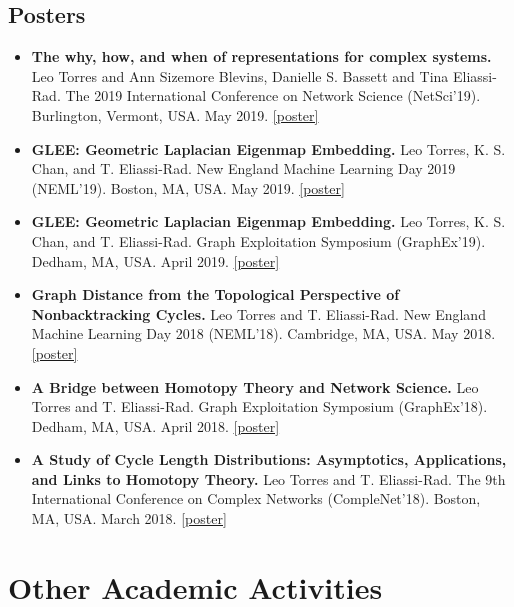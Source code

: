 \documentclass[12pt,]{scrartcl}
\begin{document}
\subsection{Posters}\label{posters}

\begin{itemize}
\leftskip-0.25in %

\item \textbf{The why, how, and when of representations for complex systems.} Leo Torres and Ann Sizemore Blevins, Danielle S. Bassett and Tina Eliassi-Rad. The 2019 International Conference on Network Science (NetSci'19). Burlington, Vermont, USA. May 2019. \href{http://leotrs.com/static/hyper_poster.pdf}{[poster]}

\item \textbf{GLEE: Geometric Laplacian Eigenmap Embedding.} Leo Torres, K. S. Chan, and T. Eliassi-Rad. New England Machine Learning Day 2019 (NEML'19). Boston, MA, USA. May 2019. \href{http://leotrs.com/static/glee_poster.pdf}{[poster]}

\item \textbf{GLEE: Geometric Laplacian Eigenmap Embedding.} Leo Torres, K. S. Chan, and T. Eliassi-Rad. Graph Exploitation Symposium (GraphEx'19). Dedham, MA, USA. April 2019. \href{http://leotrs.com/static/glee_poster.pdf}{[poster]}

\item \textbf{Graph Distance from the Topological Perspective of Nonbacktracking Cycles.} Leo Torres and T. Eliassi-Rad. New England Machine Learning Day 2018 (NEML'18). Cambridge, MA, USA. May 2018. \href{http://leotrs.com/static/neml18.pdf}{[poster]}

\item \textbf{A Bridge between Homotopy Theory and Network Science.} Leo Torres and T. Eliassi-Rad. Graph Exploitation Symposium (GraphEx'18). Dedham, MA, USA. April 2018. \href{http://leotrs.com/static/graphex18.pdf}{[poster]}

\item \textbf{A Study of Cycle Length Distributions: Asymptotics, Applications, and Links to Homotopy Theory.} Leo Torres and T. Eliassi-Rad. The 9th International Conference on Complex Networks (CompleNet'18). Boston, MA, USA. March 2018. \href{http://leotrs.com/static/complenet18.pdf}{[poster]}

\end{itemize}



\section{Other Academic Activities}\label{academic-activities}
\end{document}
